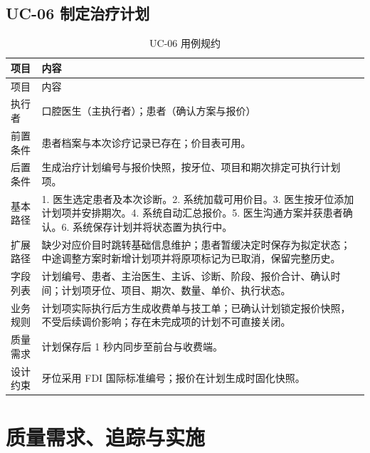 \documentclass[UTF8,a4paper,12pt,fontset=fandol]{ctexart}
\begin{document}
\subsection{UC-06 制定治疗计划}
\begin{longtable}{L{3.1cm}Z}
\caption{UC-06 用例规约}\label{tab:uc06}\\
\toprule 项目 & 内容 \\ \midrule
\endfirsthead
\toprule 项目 & 内容 \\ \midrule
\endhead
执行者 & 口腔医生（主执行者）；患者（确认方案与报价） \\
前置条件 & 患者档案与本次诊疗记录已存在；价目表可用。 \\
后置条件 & 生成治疗计划编号与报价快照，按牙位、项目和期次排定可执行计划项。 \\
基本路径 & 1. 医生选定患者及本次诊断。2. 系统加载可用价目。3. 医生按牙位添加计划项并安排期次。4. 系统自动汇总报价。5. 医生沟通方案并获患者确认。6. 系统保存计划并将状态置为执行中。 \\
扩展路径 & 缺少对应价目时跳转基础信息维护；患者暂缓决定时保存为拟定状态；中途调整方案时新增计划项并将原项标记为已取消，保留完整历史。 \\
字段列表 & 计划编号、患者、主治医生、主诉、诊断、阶段、报价合计、确认时间；计划项牙位、项目、期次、数量、单价、执行状态。 \\
业务规则 & 计划项实际执行后方生成收费单与技工单；已确认计划锁定报价快照，不受后续调价影响；存在未完成项的计划不可直接关闭。 \\
质量需求 & 计划保存后 1 秒内同步至前台与收费端。 \\
设计约束 & 牙位采用 FDI 国际标准编号；报价在计划生成时固化快照。 \\
\bottomrule
\end{longtable}

\section{质量需求、追踪与实施}
\end{document}
